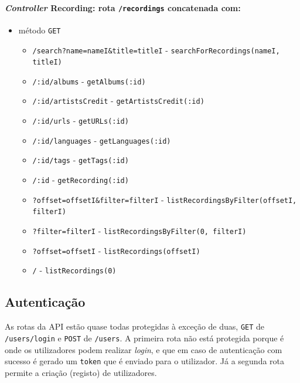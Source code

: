 \documentclass{article}
\begin{document}
\paragraph{\textit{Controller} Recording: rota \texttt{/recordings} concatenada com:}
    \begin{itemize}
        \item método \texttt{GET}
            \begin{itemize}
                \item \texttt{/search?name=nameI\&title=titleI} - \texttt{searchForRecordings(nameI, titleI)}
                \item \texttt{/:id/albums} - \texttt{getAlbums(:id)}
                \item \texttt{/:id/artistsCredit} - \texttt{getArtistsCredit(:id)}
                \item \texttt{/:id/urls} - \texttt{getURLs(:id)}
                \item \texttt{/:id/languages} - \texttt{getLanguages(:id)}
                \item \texttt{/:id/tags} - \texttt{getTags(:id)}
                \item \texttt{/:id} - \texttt{getRecording(:id)}
                \item \texttt{?offset=offsetI\&filter=filterI} - \texttt{listRecordingsByFilter(offsetI, filterI)}
                \item \texttt{?filter=filterI} - \texttt{listRecordingsByFilter(0, filterI)}
                \item \texttt{?offset=offsetI} - \texttt{listRecordings(offsetI)}
                \item \texttt{/} - \texttt{listRecordings(0)}
            \end{itemize}
    \end{itemize}

\subsection{Autenticação} \label{auth}

As rotas da API estão quase todas protegidas à exceção de duas, \texttt{GET} de \texttt{/users/login} e \texttt{POST} de \texttt{/users}. A primeira rota não está protegida porque é onde os utilizadores podem realizar \textit{login}, e que em caso de autenticação com sucesso é gerado um \texttt{token} que é enviado para o utilizador. Já a segunda rota permite a criação (registo) de utilizadores.
\end{document}
